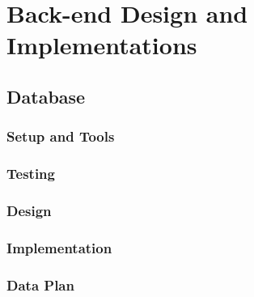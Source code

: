 \section{Back-end Design and Implementations}
\label{sec:sec03}

\subsection{Database}
\label{subsec:database}

\subsubsection{Setup and Tools}
\label{subsubsec:dbsetup}


\subsubsection{Testing}
\label{subsubsec:dbtesting}


\subsubsection{Design}
\label{subsubsec:dbdesign}


\subsubsection{Implementation}
\label{subsubsec:dbimplementation}


\subsubsection{Data Plan}
\label{subsubsec:dbdataplan}


